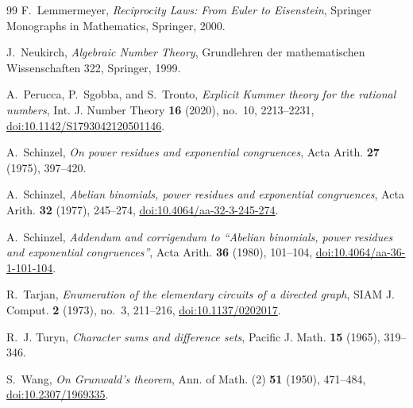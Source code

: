 \documentclass[11pt]{article}
\theoremstyle{definition}
\theoremstyle{remark}
\begin{document}
\begin{thebibliography}{99}
F.~Lemmermeyer,
\emph{Reciprocity Laws: From Euler to Eisenstein}, Springer Monographs in
Mathematics, Springer, 2000.

J.~Neukirch,
\emph{Algebraic Number Theory}, Grundlehren der mathematischen
Wissenschaften 322, Springer, 1999.

A.~Perucca, P.~Sgobba, and S.~Tronto,
\emph{Explicit Kummer theory for the rational numbers},
Int. J. Number Theory \textbf{16} (2020), no.~10, 2213--2231,
\href{https://doi.org/10.1142/S1793042120501146}{doi:10.1142/S1793042120501146}.

A.~Schinzel,
\emph{On power residues and exponential congruences},
Acta Arith. \textbf{27} (1975), 397--420.

A.~Schinzel,
\emph{Abelian binomials, power residues and exponential congruences},
Acta Arith. \textbf{32} (1977), 245--274,
\href{https://doi.org/10.4064/aa-32-3-245-274}{doi:10.4064/aa-32-3-245-274}.

A.~Schinzel,
\emph{Addendum and corrigendum to ``Abelian binomials, power residues and
exponential congruences''}, Acta Arith. \textbf{36} (1980), 101--104,
\href{https://doi.org/10.4064/aa-36-1-101-104}{doi:10.4064/aa-36-1-101-104}.

R.~Tarjan,
\emph{Enumeration of the elementary circuits of a directed graph},
SIAM J. Comput. \textbf{2} (1973), no.~3, 211--216,
\href{https://doi.org/10.1137/0202017}{doi:10.1137/0202017}.

R.~J. Turyn,
\emph{Character sums and difference sets},
Pacific J. Math. \textbf{15} (1965), 319--346.

S.~Wang,
\emph{On Grunwald's theorem},
Ann. of Math. (2) \textbf{51} (1950), 471--484,
\href{https://doi.org/10.2307/1969335}{doi:10.2307/1969335}.

\end{thebibliography}
\end{document}
